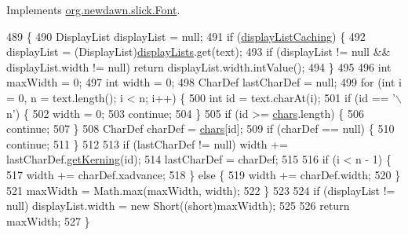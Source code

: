 Implements \mbox{\hyperlink{interfaceorg_1_1newdawn_1_1slick_1_1_font_a6dbdd5828730e18fcf0612307d0394b1}{org.\+newdawn.\+slick.\+Font}}.


\begin{DoxyCode}
489                                      \{
490         DisplayList displayList = null;
491         \textcolor{keywordflow}{if} (\mbox{\hyperlink{classorg_1_1newdawn_1_1slick_1_1_angel_code_font_a1b429bd8175e017d9df97818af84cb06}{displayListCaching}}) \{
492             displayList = (DisplayList)\mbox{\hyperlink{classorg_1_1newdawn_1_1slick_1_1_angel_code_font_ad2583887204ad560daf5546b8eb6ee7d}{displayLists}}.get(text);
493             \textcolor{keywordflow}{if} (displayList != null && displayList.width != null) \textcolor{keywordflow}{return} displayList.width.intValue();
494         \}
495         
496         \textcolor{keywordtype}{int} maxWidth = 0;
497         \textcolor{keywordtype}{int} width = 0;
498         CharDef lastCharDef = null;
499         \textcolor{keywordflow}{for} (\textcolor{keywordtype}{int} i = 0, n = text.length(); i < n; i++) \{
500             \textcolor{keywordtype}{int} \textcolor{keywordtype}{id} = text.charAt(i);
501             \textcolor{keywordflow}{if} (\textcolor{keywordtype}{id} == \textcolor{charliteral}{'\(\backslash\)n'}) \{
502                 width = 0;
503                 \textcolor{keywordflow}{continue};
504             \}
505             \textcolor{keywordflow}{if} (\textcolor{keywordtype}{id} >= \mbox{\hyperlink{classorg_1_1newdawn_1_1slick_1_1_angel_code_font_acdb3d26438f0f30d33db0a543715a3b1}{chars}}.length) \{
506                 \textcolor{keywordflow}{continue};
507             \}
508             CharDef charDef = \mbox{\hyperlink{classorg_1_1newdawn_1_1slick_1_1_angel_code_font_acdb3d26438f0f30d33db0a543715a3b1}{chars}}[id];
509             \textcolor{keywordflow}{if} (charDef == null) \{
510                 \textcolor{keywordflow}{continue};
511             \}
512 
513             \textcolor{keywordflow}{if} (lastCharDef != null) width += lastCharDef.\mbox{\hyperlink{classorg_1_1newdawn_1_1slick_1_1_angel_code_font_1_1_char_def_a3b153d43da2f6f3b07e49804b762470d}{getKerning}}(\textcolor{keywordtype}{id});
514             lastCharDef = charDef;
515 
516             \textcolor{keywordflow}{if} (i < n - 1) \{
517                 width += charDef.xadvance;
518             \} \textcolor{keywordflow}{else} \{
519                 width += charDef.width;
520             \}
521             maxWidth = Math.max(maxWidth, width);
522         \}
523         
524         \textcolor{keywordflow}{if} (displayList != null) displayList.width = \textcolor{keyword}{new} Short((\textcolor{keywordtype}{short})maxWidth);
525         
526         \textcolor{keywordflow}{return} maxWidth;
527     \}
\end{DoxyCode}
\mbox{\label{classorg_1_1newdawn_1_1slick_1_1_angel_code_font_af88eab0e69e2ff42c027bbcbeb6ccd1f}} 
